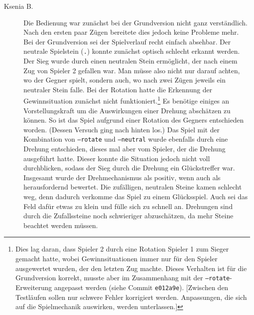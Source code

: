 \documentclass[a4paper,11pt,hidelinks]{scrartcl}
\begin{document}
\begin{description}
    \item[Ksenia B.] Die Bedienung war zunächst bei der Grundversion nicht ganz verständlich. Nach den ersten paar Zügen bereitete dies jedoch keine Probleme mehr. Bei der Grundversion sei der Spielverlauf recht einfach absehbar. Der neutrale Spielstein (\texttt{.}) konnte zunächst optisch schlecht erkannt werden. Der Sieg wurde durch einen neutralen Stein ermöglicht, der nach einem Zug von Spieler 2 gefallen war. Man müsse also nicht nur darauf achten, wo der Gegner spielt, sondern auch, wo nach zwei Zügen jeweils ein neutraler Stein falle. Bei der Rotation hatte die Erkennung der Gewinnsituation zunächst nicht funktioniert.\footnote{Dies lag daran, dass Spieler 2 durch eine Rotation Spieler 1 zum Sieger gemacht hatte, wobei Gewinnsituationen immer nur für den Spieler ausgewertet wurden, der den letzten Zug machte. Dieses Verhalten ist für die Grundversion korrekt, musste aber im Zusammenhang mit der \texttt{--rotate}-Erweiterung angepasst werden (siehe Commit \texttt{e012a9e}). [Zwischen den Testläufen sollen nur schwere Fehler korrigiert werden. Anpassungen, die sich auf die Spielmechanik auswirken, werden unterlassen.]} Es benötige einiges an Vorstellungskraft um die Auswirkungen einer Drehung abschätzen zu können. So ist das Spiel aufgrund einer Rotation des Gegners entschieden worden. (Dessen Versuch ging nach hinten los.) Das Spiel mit der Kombination von \texttt{--rotate} und \texttt{--neutral} wurde ebenfalls durch eine Drehung entschieden, dieses mal aber vom Spieler, der die Drehung ausgeführt hatte. Dieser konnte die Situation jedoch nicht voll durchblicken, sodass der Sieg durch die Drehung ein Glückstreffer war. Insgesamt wurde der Drehmechanismus als positiv, wenn auch als herausfordernd bewertet. Die zufälligen, neutralen Steine kamen schlecht weg, denn dadurch verkomme das Spiel zu einem Glücksspiel. Auch sei das Feld dafür etwas zu klein und fülle sich zu schnell an. Drehungen sind durch die Zufallssteine noch schwieriger abzuschätzen, da mehr Steine beachtet werden müssen.

\end{description}
\end{document}
